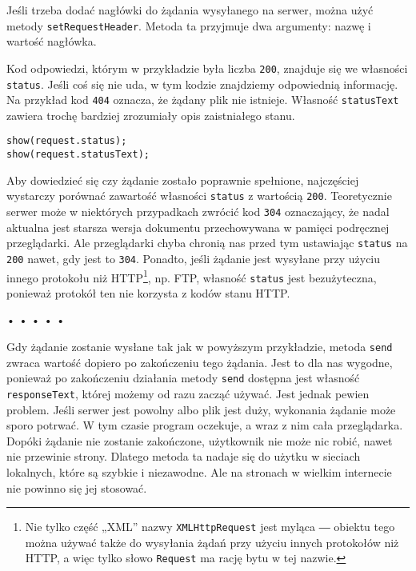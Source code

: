 Jeśli trzeba dodać nagłówki do żądania wysyłanego na serwer, można użyć metody \texttt{setRequestHeader}. Metoda ta przyjmuje dwa argumenty: nazwę i wartość nagłówka.

  
Kod odpowiedzi, którym w przykładzie była liczba \texttt{200}, znajduje się we własności \texttt{status}. Jeśli coś się nie uda, w tym kodzie znajdziemy odpowiednią informację. Na przykład kod \texttt{404} oznacza, że żądany plik nie istnieje. Własność \texttt{statusText} zawiera trochę bardziej zrozumiały opis zaistniałego stanu.

  
\begin{verbatim} 
show(request.status);
show(request.statusText);
 \end{verbatim}
  
Aby dowiedzieć się czy żądanie zostało poprawnie spełnione, najczęściej wystarczy porównać zawartość własności \texttt{status} z wartością \texttt{200}. Teoretycznie serwer może w niektórych przypadkach zwrócić kod \texttt{304} oznaczający, że nadal aktualna jest starsza wersja dokumentu przechowywana w pamięci podręcznej przeglądarki. Ale przeglądarki chyba chronią nas przed tym ustawiając \texttt{status} na \texttt{200} nawet, gdy jest to \texttt{304}. Ponadto, jeśli żądanie jest wysyłane przy użyciu innego protokołu niż HTTP\footnote{Nie tylko część „XML” nazwy \texttt{XMLHttpRequest} jest myląca ― obiektu tego można używać także do wysyłania żądań przy użyciu innych protokołów niż HTTP, a więc tylko słowo \texttt{Request} ma rację bytu w tej nazwie.}, np. FTP, własność \texttt{status} jest bezużyteczna, ponieważ protokół ten nie korzysta z kodów stanu HTTP.



\begin{center}
• • • • •
\end{center}

  
Gdy żądanie zostanie wysłane tak jak w powyższym przykładzie, metoda \texttt{send} zwraca wartość dopiero po zakończeniu tego żądania. Jest to dla nas wygodne, ponieważ po zakończeniu działania metody \texttt{send} dostępna jest własność \texttt{responseText}, której możemy od razu zacząć używać. Jest jednak pewien problem. Jeśli serwer jest powolny albo plik jest duży, wykonania żądanie może sporo potrwać. W tym czasie program oczekuje, a wraz z nim cała przeglądarka. Dopóki żądanie nie zostanie zakończone, użytkownik nie może nic robić, nawet nie przewinie strony. Dlatego metoda ta nadaje się do użytku w sieciach lokalnych, które są szybkie i niezawodne. Ale na stronach w wielkim internecie nie powinno się jej stosować.

